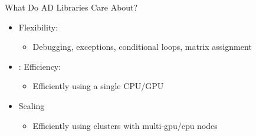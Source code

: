 \documentclass[dvipsnames, aspectratio=169]{beamer}
\begin{document}
\begin{frame}{What Do AD Libraries Care About?}
    \begin{itemize}
        \item Flexibility:
         \begin{itemize}
             \item Debugging, exceptions, conditional loops, matrix assignment
         \end{itemize}
         \item: Efficiency:
         \begin{itemize}
             \item Efficiently using a single CPU/GPU
         \end{itemize}
         \item Scaling
         \begin{itemize}
             \item Efficiently using clusters with multi-gpu/cpu nodes
         \end{itemize}
    \end{itemize}
\end{frame}
\end{document}
